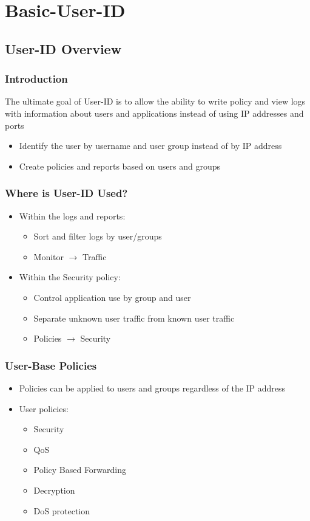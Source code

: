 \section{Basic-User-ID}
\subsection{User-ID Overview}
\subsubsection{Introduction}
The ultimate goal of User-ID is to allow the ability to write policy and view logs with information about users and applications instead of using IP addresses and ports
\begin{itemize}
    \item Identify the user by username and user group instead of by IP address
    \item Create policies and reports based on users and groups
\end{itemize}

\subsubsection{Where is User-ID Used?}
\begin{itemize}
    \item Within the logs and reports:
        \begin{itemize}
            \item Sort and filter logs by user/groups
            \item Monitor $\rightarrow$ Traffic
        \end{itemize}
    \item Within the Security policy:
        \begin{itemize}
            \item Control application use by group and user
            \item Separate unknown user traffic from known user traffic
            \item Policies $\rightarrow$ Security
        \end{itemize}
\end{itemize}

\subsubsection{User-Base Policies}
\begin{itemize}
    \item Policies can be applied to users and groups regardless of the IP address
    \item User policies:
        \begin{itemize}
            \item Security
            \item QoS
            \item Policy Based Forwarding
            \item Decryption
            \item DoS protection
        \end{itemize}
\end{itemize}

